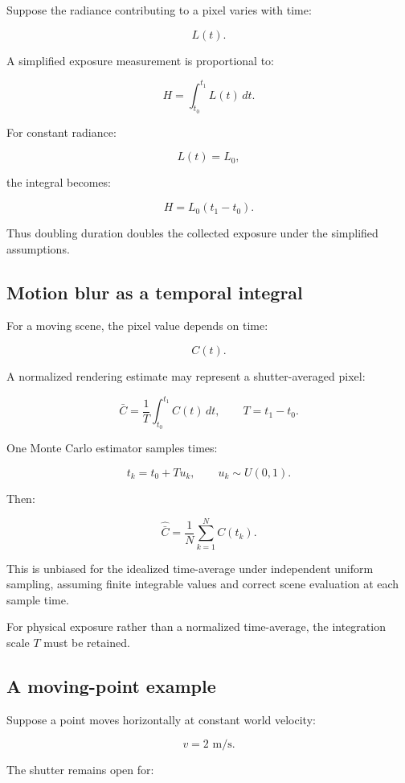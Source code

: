 Suppose the radiance contributing to a pixel varies with time:

\[ L(t). \]

A simplified exposure measurement is proportional to:

\[ \boxed{ H=\int_{t_0}^{t_1}L(t)\,dt. } \]

For constant radiance:

\[ L(t)=L_0, \]

the integral becomes:

\[ \boxed{ H=L_0(t_1-t_0). } \]

Thus doubling duration doubles the collected exposure under the simplified assumptions.

\subsection{Motion blur as a temporal integral}\label{02-foundations-ii-ch036-motion-blur-as-a-temporal-integral}

For a moving scene, the pixel value depends on time:

\[ C(t). \]

A normalized rendering estimate may represent a shutter-averaged pixel:

\[ \boxed{ \bar C= \frac1T\int_{t_0}^{t_1}C(t)\,dt, \qquad T=t_1-t_0. } \]

One Monte Carlo estimator samples times:

\[ t_k=t_0+Tu_k, \qquad u_k\sim U(0,1). \]

Then:

\[ \boxed{ \widehat{\bar C} = \frac1N\sum_{k=1}^{N}C(t_k). } \]

This is unbiased for the idealized time-average under independent uniform sampling, assuming finite integrable values and correct scene evaluation at each sample time.

For physical exposure rather than a normalized time-average, the integration scale \(T\) must be retained.

\subsection{A moving-point example}\label{02-foundations-ii-ch036-a-moving-point-example}

Suppose a point moves horizontally at constant world velocity:

\[ v=2\text{ m/s}. \]

The shutter remains open for:

